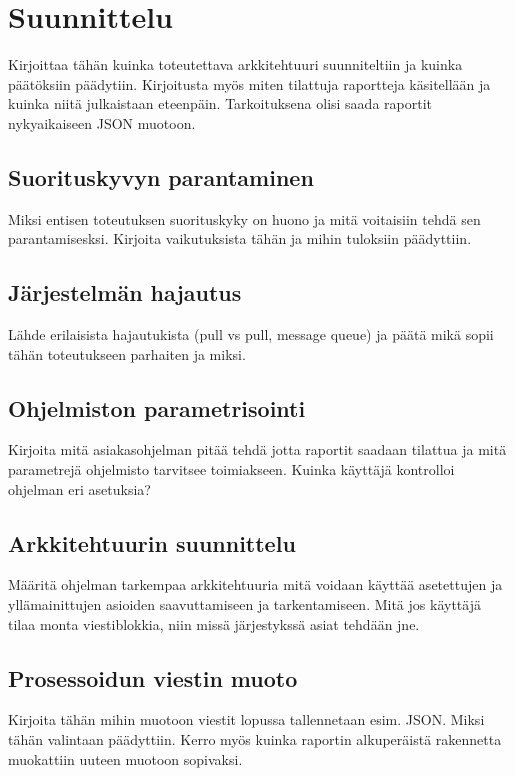 \chapter{Suunnittelu}
\label{ch:suunnittelu}
\begin{it}
	Kirjoittaa tähän kuinka toteutettava arkkitehtuuri suunniteltiin ja kuinka päätöksiin päädytiin. Kirjoitusta myös miten tilattuja raportteja käsitellään ja kuinka niitä julkaistaan eteenpäin. Tarkoituksena olisi saada raportit nykyaikaiseen JSON muotoon.
\end{it}

\section{Suorituskyvyn parantaminen}
\begin{it}
	Miksi entisen toteutuksen suorituskyky on huono ja mitä voitaisiin tehdä sen parantamisesksi. Kirjoita vaikutuksista tähän ja mihin tuloksiin päädyttiin.
\end{it}

\section{Järjestelmän hajautus}
\begin{it}
	Lähde erilaisista hajautukista (pull vs pull, message queue) ja päätä mikä sopii tähän toteutukseen parhaiten ja miksi.
\end{it}

\section{Ohjelmiston parametrisointi}
\begin{it}
	Kirjoita mitä asiakasohjelman pitää tehdä jotta raportit saadaan tilattua ja mitä parametrejä ohjelmisto tarvitsee toimiakseen. Kuinka käyttäjä kontrolloi ohjelman eri asetuksia?
\end{it}

\section{Arkkitehtuurin suunnittelu}
\begin{it}
	Määritä ohjelman tarkempaa arkkitehtuuria mitä voidaan käyttää asetettujen ja yllämainittujen asioiden saavuttamiseen ja tarkentamiseen. Mitä jos käyttäjä tilaa monta viestiblokkia, niin missä järjestykssä asiat tehdään jne.
\end{it}

\section{Prosessoidun viestin muoto}
\begin{it}
	Kirjoita tähän mihin muotoon viestit lopussa tallennetaan esim. JSON. Miksi tähän valintaan päädyttiin. Kerro myös kuinka raportin alkuperäistä rakennetta muokattiin uuteen muotoon sopivaksi.
\end{it}